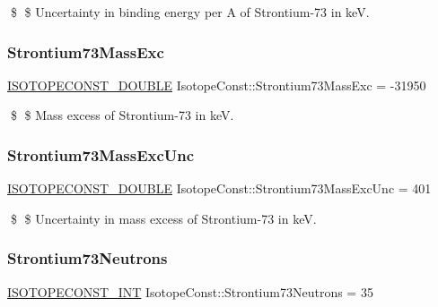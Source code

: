 \$ \$ Uncertainty in binding energy per A of Strontium-\/73 in keV. \mbox{\label{group___isotope_const-_strontium-_sr73_ga7a6dcdac6ad54691fc499686550464b7}} 
\subsubsection{\texorpdfstring{Strontium73\+Mass\+Exc}{Strontium73MassExc}}
{\footnotesize\ttfamily \mbox{\hyperlink{group___isotope_const-_macros_ga8f45a7272ce02c0b4c65c44636ed719a}{I\+S\+O\+T\+O\+P\+E\+C\+O\+N\+S\+T\+\_\+\+D\+O\+U\+B\+LE}} Isotope\+Const\+::\+Strontium73\+Mass\+Exc = -\/31950}

\$ \$ Mass excess of Strontium-\/73 in keV. \mbox{\label{group___isotope_const-_strontium-_sr73_ga58888b727f91ab28c947ce966330dcab}} 
\subsubsection{\texorpdfstring{Strontium73\+Mass\+Exc\+Unc}{Strontium73MassExcUnc}}
{\footnotesize\ttfamily \mbox{\hyperlink{group___isotope_const-_macros_ga8f45a7272ce02c0b4c65c44636ed719a}{I\+S\+O\+T\+O\+P\+E\+C\+O\+N\+S\+T\+\_\+\+D\+O\+U\+B\+LE}} Isotope\+Const\+::\+Strontium73\+Mass\+Exc\+Unc = 401}

\$ \$ Uncertainty in mass excess of Strontium-\/73 in keV. \mbox{\label{group___isotope_const-_strontium-_sr73_gafa2edbab75a02a1a03a88e78d89fb9e2}} 
\subsubsection{\texorpdfstring{Strontium73\+Neutrons}{Strontium73Neutrons}}
{\footnotesize\ttfamily \mbox{\hyperlink{group___isotope_const-_macros_ga5f18360b3e99483a35c32d789e62621c}{I\+S\+O\+T\+O\+P\+E\+C\+O\+N\+S\+T\+\_\+\+I\+NT}} Isotope\+Const\+::\+Strontium73\+Neutrons = 35}

